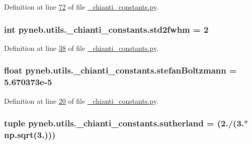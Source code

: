 Definition at line \hyperlink{__chianti__constants_8py_source_l00072}{72} of file \hyperlink{__chianti__constants_8py_source}{\-\_\-chianti\-\_\-constants.\-py}.

\hypertarget{namespacepyneb_1_1utils_1_1__chianti__constants_aa3ee9d102b81039a0142254fbf5eb8fe}{
\subsubsection[{std2fwhm}]{\setlength{\rightskip}{0pt plus 5cm}int pyneb.\-utils.\-\_\-chianti\-\_\-constants.\-std2fwhm = 2}}\label{namespacepyneb_1_1utils_1_1__chianti__constants_aa3ee9d102b81039a0142254fbf5eb8fe}


Definition at line \hyperlink{__chianti__constants_8py_source_l00038}{38} of file \hyperlink{__chianti__constants_8py_source}{\-\_\-chianti\-\_\-constants.\-py}.

\hypertarget{namespacepyneb_1_1utils_1_1__chianti__constants_ab50a2106d6a3159beb3b0e0edcefec89}{
\subsubsection[{stefan\-Boltzmann}]{\setlength{\rightskip}{0pt plus 5cm}float pyneb.\-utils.\-\_\-chianti\-\_\-constants.\-stefan\-Boltzmann = 5.\-670373e-\/5}}\label{namespacepyneb_1_1utils_1_1__chianti__constants_ab50a2106d6a3159beb3b0e0edcefec89}


Definition at line \hyperlink{__chianti__constants_8py_source_l00020}{20} of file \hyperlink{__chianti__constants_8py_source}{\-\_\-chianti\-\_\-constants.\-py}.

\hypertarget{namespacepyneb_1_1utils_1_1__chianti__constants_ae948d4e5d259213534b8373b3819e39a}{
\subsubsection[{sutherland}]{\setlength{\rightskip}{0pt plus 5cm}tuple pyneb.\-utils.\-\_\-chianti\-\_\-constants.\-sutherland = (2./(3.$\ast$np.\-sqrt(3.)))}}\label{namespacepyneb_1_1utils_1_1__chianti__constants_ae948d4e5d259213534b8373b3819e39a}


